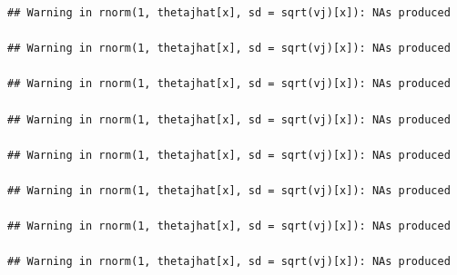 \documentclass[
]{book}
\newenvironment{Shaded}{\begin{snugshade}}{\end{snugshade}}
\newcommand{\AttributeTok}[1]{\textcolor[rgb]{0.77,0.63,0.00}{#1}}
\newcommand{\ControlFlowTok}[1]{\textcolor[rgb]{0.13,0.29,0.53}{\textbf{#1}}}
\newcommand{\DecValTok}[1]{\textcolor[rgb]{0.00,0.00,0.81}{#1}}
\newcommand{\DocumentationTok}[1]{\textcolor[rgb]{0.56,0.35,0.01}{\textbf{\textit{#1}}}}
\newcommand{\FunctionTok}[1]{\textcolor[rgb]{0.00,0.00,0.00}{#1}}
\newcommand{\NormalTok}[1]{#1}
\newcommand{\OtherTok}[1]{\textcolor[rgb]{0.56,0.35,0.01}{#1}}
\newcommand{\SpecialCharTok}[1]{\textcolor[rgb]{0.00,0.00,0.00}{#1}}
\theoremstyle{definition}
\theoremstyle{definition}
\theoremstyle{definition}
\theoremstyle{definition}
\theoremstyle{remark}
\begin{document}
\begin{Shaded}
\end{Shaded}

\begin{verbatim}
## Warning in rnorm(1, thetajhat[x], sd = sqrt(vj)[x]): NAs produced

## Warning in rnorm(1, thetajhat[x], sd = sqrt(vj)[x]): NAs produced

## Warning in rnorm(1, thetajhat[x], sd = sqrt(vj)[x]): NAs produced

## Warning in rnorm(1, thetajhat[x], sd = sqrt(vj)[x]): NAs produced

## Warning in rnorm(1, thetajhat[x], sd = sqrt(vj)[x]): NAs produced

## Warning in rnorm(1, thetajhat[x], sd = sqrt(vj)[x]): NAs produced

## Warning in rnorm(1, thetajhat[x], sd = sqrt(vj)[x]): NAs produced

## Warning in rnorm(1, thetajhat[x], sd = sqrt(vj)[x]): NAs produced
\end{verbatim}
\end{document}
